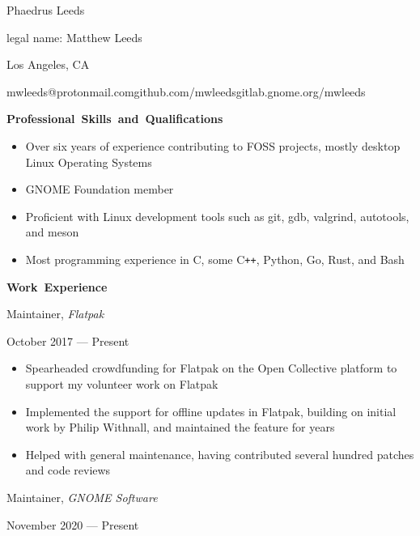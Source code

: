 \documentclass[11pt]{article}
\begin{document}
\centerline{\huge Phaedrus Leeds}
\vspace{0.4em}
\centerline{\normalsize legal name: Matthew Leeds}
\centerline{\normalsize Los Angeles, CA}
\centerline{\normalsize mwleeds@protonmail.com\space \textbar \space github.com/mwleeds\space \textbar \space gitlab.gnome.org/mwleeds}

\vspace{0.6em}
\hbox{\large \textbf{Professional Skills and Qualifications}}

\begin{itemize}
  \item Over six years of experience contributing to FOSS projects, mostly desktop Linux Operating Systems
  \item GNOME Foundation member
  \item Proficient with Linux development tools such as git, gdb, valgrind, autotools, and meson
  \item Most programming experience in C, some C\texttt{++}, Python, Go, Rust, and Bash
\end{itemize}

\vspace{0.6em}
\hbox{\large \textbf{Work Experience}}

\begin{minipage}[t]{0.65\textwidth}
\flushleft
Maintainer, \textit{Flatpak}\\
\end{minipage}
\begin{minipage}[t]{0.30\textwidth}
\flushright
October 2017 --- Present\\
\end{minipage}

\begin{itemize}
  \item Spearheaded crowdfunding for Flatpak on the Open Collective platform to support my volunteer work on Flatpak
  \item Implemented the support for offline updates in Flatpak, building on initial work by Philip Withnall, and maintained the feature for years
  \item Helped with general maintenance, having contributed several hundred patches and code reviews
\end{itemize}

\begin{minipage}[t]{0.65\textwidth}
\flushleft
Maintainer, \textit{GNOME Software}\\
\end{minipage}
\begin{minipage}[t]{0.30\textwidth}
\flushright
November 2020 --- Present\\
\end{minipage}
\end{document}
